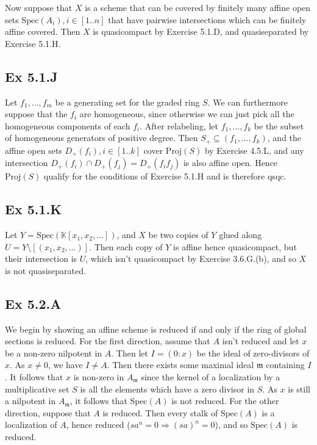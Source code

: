 \documentclass{article}
\theoremstyle{definition}
\newcommand{\K}{\mathbb{K}}
\newcommand{\Spec}{\text{Spec}}
\newcommand{\Proj}{\text{Proj}}
\begin{document}
Now suppose that $X$ is a scheme that can be covered by finitely many affine
open sets $\Spec(A_i), i \in [1..n]$ that have pairwise intersections which can
be finitely affine covered. Then $X$ is quasicompact by Exercise 5.1.D, and
quasiseparated by Exercise 5.1.H.

\subsection*{Ex 5.1.J}

Let $f_1, \ldots, f_m$ be a generating set for the graded ring $S$. We can
furthermore suppose that the $f_i$ are homogeneous, since otherwise we can just
pick all the homogeneous components of each $f_i$. After relabeling, let $f_1,
	\ldots, f_k$ be the subset of homogeneous generators of positive degree. Then
$S_{+} \subseteq (f_1, \ldots, f_k)$, and the affine open sets $D_{+}(f_i), i
	\in [1..k]$ cover $\Proj(S)$ by Exercise 4.5.L, and any intersection
$D_{+}(f_i) \cap D_{+}(f_j) = D_{+}(f_i f_j)$ is also affine open. Hence
$\Proj(S)$ qualify for the conditions of Exercise 5.1.H and is therefore qsqc.

\subsection*{Ex 5.1.K}

Let $Y = \Spec(\K[x_1,x_2,\ldots])$, and $X$ be two copies of $Y$ glued along
$U = Y \setminus [(x_1, x_2, \ldots)]$. Then each copy of $Y$ is affine hence
quasicompact, but their intersection is $U$, which isn't quasicompact by
Exercise 3.6.G.(b), and so $X$ is not quasiseparated.


\subsection*{Ex 5.2.A}

We begin by showing an affine scheme is reduced if and only if the ring of
global sections is reduced. For the first direction, assume that $A$ isn't
reduced and let $x$ be a non-zero nilpotent in $A$. Then let $I = (0 : x)$ be
the ideal of zero-divisors of $x$. As $x \not = 0$, we have $I \not = A$. Then
there exists some maximal ideal $\mathfrak{m}$ containing $I$. It follows that
$x$ is non-zero in $A_{\mathfrak{m}}$ since the kernel of a localization by a
multiplicative set $S$ is all the elements which have a zero divisor in $S$. As
$x$ is still a nilpotent in $A_{\mathfrak{m}}$, it follows that $\Spec(A)$ is
not reduced. For the other direction, suppose that $A$ is reduced. Then every
stalk of $\Spec(A)$ is a localization of $A$, hence reduced ($sa^n = 0
	\Rightarrow (sa)^n = 0$), and so $\Spec(A)$ is reduced. \\
\end{document}
